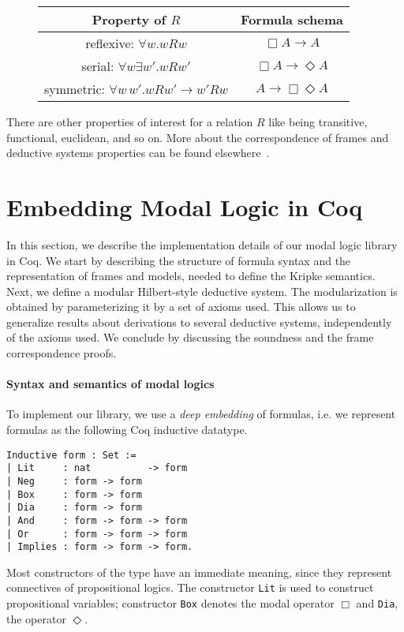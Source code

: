 \documentclass[sigconf]{acmart}
\begin{document}
\begin{figure}[H]
\begin{tabular}{|c|c|}
  \hline
  Property of $R$                          & Formula schema \\ \hline
  reflexive: $\forall w.wRw$               & $\Box A \to A$ \\ 
  serial: $\forall w\exists w'. wRw'$      & $\Box A \to \Diamond A$ \\
  symmetric: $\forall w\,w'.wRw' \to w'Rw$ & $A \to \Box\Diamond A$ \\
  \hline
\end{tabular}
\end{figure}
There are other properties of interest for a relation $R$ like being
transitive, functional, euclidean, and so on. More about the correspondence
of frames and deductive systems properties can be found elsewhere~\cite{Chellas,blackburn}.

\section{Embedding Modal Logic in Coq}\label{sec:implementation}

In this section, we describe the implementation details of our modal logic
library in Coq. We start by describing the structure of formula syntax and the
representation of frames and models, needed to define the Kripke semantics.
Next, we define a modular Hilbert-style deductive system. The modularization is
obtained by parameterizing it by a set of axioms used. This allows us to
generalize results about derivations to several deductive systems, independently
of the axioms used. We conclude by discussing the soundness and the frame
correspondence proofs.

\paragraph{Syntax and semantics of modal logics}
To implement our library, we use a \emph{deep embedding} of
formulas, i.e. we represent formulas as the following Coq inductive datatype.
\begin{verbatim}
Inductive form : Set :=
| Lit     : nat          -> form
| Neg     : form -> form
| Box     : form -> form
| Dia     : form -> form
| And     : form -> form -> form
| Or      : form -> form -> form
| Implies : form -> form -> form.
\end{verbatim}
Most constructors of the type have an immediate meaning, since they represent
connectives of propositional logics. The constructor \texttt{Lit}
is used to construct propositional variables; constructor \texttt{Box}
denotes the modal operator $\Box$ and \texttt{Dia}, the operator
$\Diamond$.
\end{document}
